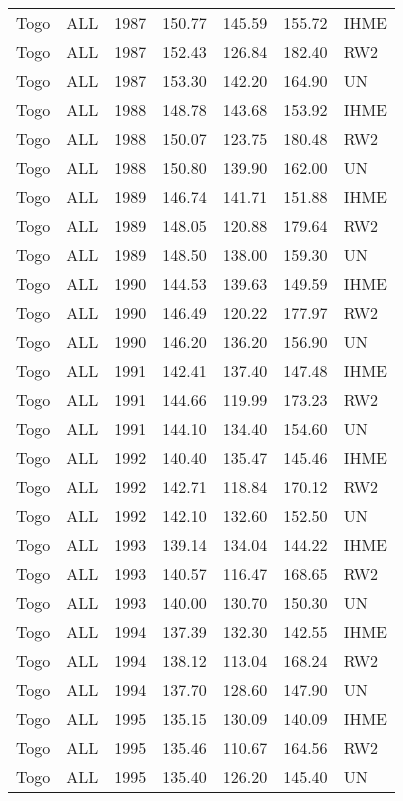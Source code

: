 \begin{longtable}{lllrrrl}
  Togo & ALL & 1987 & 150.77 & 145.59 & 155.72 & IHME \\ 
  Togo & ALL & 1987 & 152.43 & 126.84 & 182.40 & RW2 \\ 
  Togo & ALL & 1987 & 153.30 & 142.20 & 164.90 & UN \\ 
  Togo & ALL & 1988 & 148.78 & 143.68 & 153.92 & IHME \\ 
  Togo & ALL & 1988 & 150.07 & 123.75 & 180.48 & RW2 \\ 
  Togo & ALL & 1988 & 150.80 & 139.90 & 162.00 & UN \\ 
  Togo & ALL & 1989 & 146.74 & 141.71 & 151.88 & IHME \\ 
  Togo & ALL & 1989 & 148.05 & 120.88 & 179.64 & RW2 \\ 
  Togo & ALL & 1989 & 148.50 & 138.00 & 159.30 & UN \\ 
  Togo & ALL & 1990 & 144.53 & 139.63 & 149.59 & IHME \\ 
  Togo & ALL & 1990 & 146.49 & 120.22 & 177.97 & RW2 \\ 
  Togo & ALL & 1990 & 146.20 & 136.20 & 156.90 & UN \\ 
  Togo & ALL & 1991 & 142.41 & 137.40 & 147.48 & IHME \\ 
  Togo & ALL & 1991 & 144.66 & 119.99 & 173.23 & RW2 \\ 
  Togo & ALL & 1991 & 144.10 & 134.40 & 154.60 & UN \\ 
  Togo & ALL & 1992 & 140.40 & 135.47 & 145.46 & IHME \\ 
  Togo & ALL & 1992 & 142.71 & 118.84 & 170.12 & RW2 \\ 
  Togo & ALL & 1992 & 142.10 & 132.60 & 152.50 & UN \\ 
  Togo & ALL & 1993 & 139.14 & 134.04 & 144.22 & IHME \\ 
  Togo & ALL & 1993 & 140.57 & 116.47 & 168.65 & RW2 \\ 
  Togo & ALL & 1993 & 140.00 & 130.70 & 150.30 & UN \\ 
  Togo & ALL & 1994 & 137.39 & 132.30 & 142.55 & IHME \\ 
  Togo & ALL & 1994 & 138.12 & 113.04 & 168.24 & RW2 \\ 
  Togo & ALL & 1994 & 137.70 & 128.60 & 147.90 & UN \\ 
  Togo & ALL & 1995 & 135.15 & 130.09 & 140.09 & IHME \\ 
  Togo & ALL & 1995 & 135.46 & 110.67 & 164.56 & RW2 \\ 
  Togo & ALL & 1995 & 135.40 & 126.20 & 145.40 & UN \\ 

\end{longtable}
